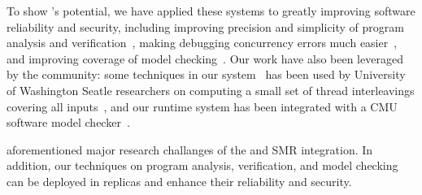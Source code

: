 To show \smt's potential, we have applied these systems to greatly improving 
software reliability and security, including improving precision and simplicity 
of program analysis and verification~\cite{wu:pldi12}, making debugging 
concurrency errors much easier~\cite{cui:tern:osdi10}, and improving coverage 
of model checking~\cite{parrot:sosp13}. Our work have also been leveraged by 
the community: some techniques in our \tern system~\cite{cui:tern:osdi10} has 
been used by University of Washington Seatle researchers on computing a small 
set of thread interleavings covering all inputs~\cite{ics:oopsla13}, and our 
\parrot runtime system has been integrated with a CMU software model 
checker~\cite{dbug:spin11}.

aforementioned major research challanges of the \smt and SMR integration. In 
addition, our techniques on program analysis, verification, and model checking 
can be deployed in \msmr replicas and enhance their reliability and security.


